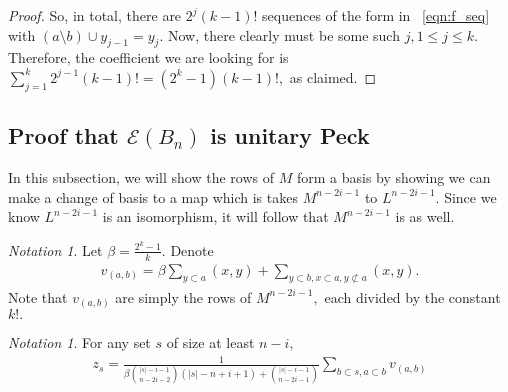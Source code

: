 \documentclass[10 pt]{amsart}
\theoremstyle{plain}
\theoremstyle{definition}
\theoremstyle{remark}
\numberwithin{equation}{section}
\theoremstyle{remark}
\newtheorem{note}[thm]{Notation}
\newcommand\ssec{\subsection}
\begin{document}
\begin{proof}
So, in total, there are $2^j(k-1)!$ sequences of the form in ~\eqref{eqn:f_seq} with $(a\setminus b) \cup y_{j-1} = y_j$. Now, there clearly must be some such $j,1 \leq j \leq k.$ Therefore, the coefficient we are looking for is $\sum_{j = 1}^k 2^{j-1}(k-1)! = (2^k - 1)(k-1)!,$ as claimed.

\end{proof}



\ssec{Proof that $\mathcal E(B_n)$ is unitary Peck}

In this subsection, we will show the rows of $M$ form a basis by showing we can make a change of basis to a map which is takes $M^{n-2i-1}$ to $L^{n-2i-1}.$ Since we know $L^{n-2i-1}$ is an isomorphism, it will follow that $M^{n-2i-1}$ is as well.

\begin{note}

Let $\beta = \frac{2^k-1}{k}.$ Denote 
\begin{align*}
	v_{(a, b)} =\beta \sum_{y \subset a}^{}(x, y) + \sum_{y\subset b,x \subset a,y\not\subset a}^{}(x, y).
\end{align*}
Note that $v_{(a, b)}$ are simply the rows of $M^{n-2i-1},$ each divided by the constant $k!.$
\end{note}

\begin{note}
For any set $s$ of size at least $n-i,$
\begin{align*}
	z_s = \frac{1}{\beta\binom {|s|-i-1}{n-2i-2}(|s|-n+i+1)+\binom{|s|-i-1}{n-2i-1}} \sum_{b\subset s,a \subset b}^{}v_{(a, b)}
\end{align*}
\end{note}
\end{document}

